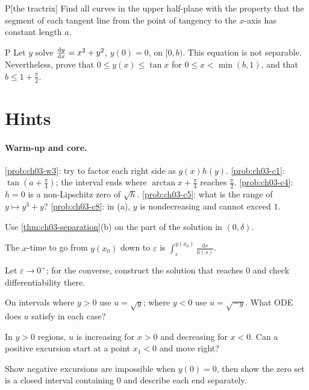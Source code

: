 \begin{problem}{P}[the tractrix]\label{prob:ch03-p2}
Find all curves in the upper half-plane with the property that the segment of
each tangent line from the point of tangency to the $x$-axis has constant
length $a$.
\end{problem}

\begin{problem}{P}\label{prob:ch03-p3}
Let $y$ solve $\frac{\mathrm{d}y}{\mathrm{d}x} = x^2 + y^2$, $y(0) = 0$, on $[0,b)$. This equation
is not separable. Nevertheless, prove that $0\le y(x)\le\tan x$ for
$0\le x<\min(b,1)$, and that $b\le 1 + \frac\pi2$.
\end{problem}

\section{Hints}\label{sec:ch03-hints}

\paragraph{Warm-up and core.}
\cref{prob:ch03-w3}: try to factor each right side as $g(x)h(y)$.
\cref{prob:ch03-c1}: $\tan(a + \frac\pi4)$; the interval ends where
$\arctan x + \frac\pi4$ reaches $\frac\pi2$.
\cref{prob:ch03-c4}: $h = 0$ is a non-Lipschitz zero of $\sqrt h$.
\cref{prob:ch03-c5}: what is the range of $y\mapsto y^3 + y$?
\cref{prob:ch03-c8}: in (a), $y$ is nondecreasing and cannot exceed $1$.

\begin{hintlevels}
  \item Use \cref{thm:ch03-separation}(b) on the part of the solution in
        $(0,\delta)$.
  \item The $x$-time to go from $y(x_0)$ down to $\varepsilon$ is
        $\int_\varepsilon^{y(x_0)}\frac{\mathrm{d}s}{h(s)}$.
  \item Let $\varepsilon\to0^+$; for the converse, construct the solution that
        reaches $0$ and check differentiability there.
\end{hintlevels}

\begin{hintlevels}
  \item On intervals where $y>0$ use $u = \sqrt y$; where $y<0$ use
        $u = \sqrt{-y}$. What ODE does $u$ satisfy in each case?
  \item In $y>0$ regions, $u$ is increasing for $x>0$ and decreasing for $x<0$.
        Can a positive excursion start at a point $x_1<0$ and move right?
  \item Show negative excursions are impossible when $y(0) = 0$, then show
        the zero set is a closed interval containing $0$ and describe each end
        separately.
\end{hintlevels}

